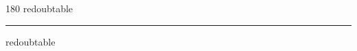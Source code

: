 
\begin{frame}
\begin{center}
\begin{turn}{180}
{\fontsize{2.5cm}{1em}\selectfont redoubtable}
\end{turn}
\vspace{1em}\par  
\hrule
\vspace{1em}\par  
{\fontsize{2.5cm}{1em}\selectfont redoubtable}
\end{center}
\end{frame}
